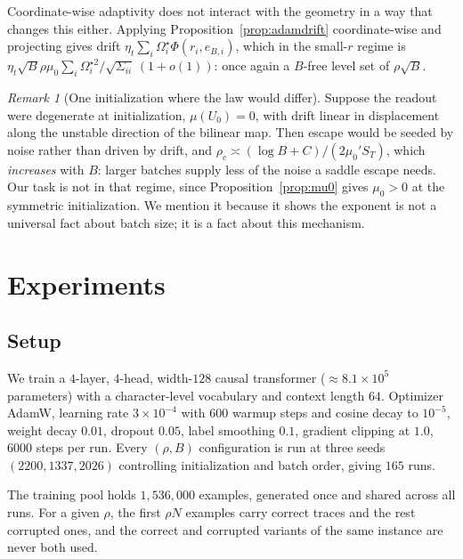 \documentclass{article}
\theoremstyle{plain}
\theoremstyle{definition}
\theoremstyle{remark}
\newtheorem{remark}{Remark}
\newcommand{\1}{\mathbf{1}}
\newcommand{\Om}{\Omega}
\begin{document}
Coordinate-wise adaptivity does not interact with the geometry in a way that
changes this either. Applying Proposition~\ref{prop:adamdrift} coordinate-wise
and projecting gives drift $\eta_t\sum_i\Om^\star_i\Phi(r_i,e_{B,i})$, which in
the small-$r$ regime is
$\eta_t\sqrt B\rho\mu_0\sum_i\Om^{\star2}_i/\sqrt{\Sigma_{ii}}\,(1+o(1))$: once
again a $B$-free level set of $\rho\sqrt B$.

\begin{remark}[One initialization where the law would differ]
\label{rem:saddle}
Suppose the readout were degenerate at initialization, $\mu(U_0) = 0$, with drift
linear in displacement along the unstable direction of the bilinear map. Then
escape would be seeded by noise rather than driven by drift, and
$\rho_c\asymp(\log B+C)/(2\mu_0'S_T)$, which \emph{increases} with $B$: larger
batches supply less of the noise a saddle escape needs. Our task is not in that
regime, since Proposition~\ref{prop:mu0} gives $\mu_0>0$ at the symmetric
initialization. We mention it because it shows the exponent is not a universal
fact about batch size; it is a fact about this mechanism.
\end{remark}

\section{Experiments}
\label{sec:experiments}

\subsection{Setup}

We train a $4$-layer, $4$-head, width-$128$ causal transformer
($\approx8.1\times10^5$ parameters) with a character-level vocabulary and context
length $64$. Optimizer AdamW, learning rate $3\times10^{-4}$ with $600$ warmup
steps and cosine decay to $10^{-5}$, weight decay $0.01$, dropout $0.05$, label
smoothing $0.1$, gradient clipping at $1.0$, $6000$ steps per run. Every
$(\rho,B)$ configuration is run at three seeds $(2200,1337,2026)$ controlling
initialization and batch order, giving $165$ runs.

The training pool holds $1{,}536{,}000$ examples, generated once and shared
across all runs. For a given $\rho$, the first $\rho N$ examples carry correct
traces and the rest corrupted ones, and the correct and corrupted variants of the
same instance are never both used.
\end{document}
